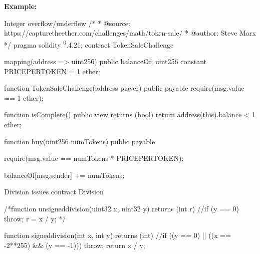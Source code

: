 \documentclass{article}
\begin{document}
\textbf{Example:} 

Integer overflow/underflow
/*
* @source: https://capturetheether.com/challenges/math/token-sale/
* @author: Steve Marx
*/
pragma solidity \textsuperscript0.4.21;
contract TokenSaleChallenge {
    mapping(address => uint256) public balanceOf;
    uint256 constant PRICE\textunderscore PER\textunderscore TOKEN = 1 ether;

    function TokenSaleChallenge(address \textunderscore player) public payable {
        require(msg.value == 1 ether);
    }

    function isComplete() public view returns (bool) {
        return address(this).balance < 1 ether;
    }

    function buy(uint256 numTokens) public payable {
        require(msg.value == numTokens * PRICE\textunderscore PER\textunderscore TOKEN);

        balanceOf[msg.sender] += numTokens;
    }
}

Division issues
contract Division {

    /*function unsigned\textunderscore division(uint32 x, uint32 y) returns (int r) {
      //if (y == 0) { throw; }
      r = x / y;
    }*/

    function signed\textunderscore division(int x, int y) returns (int) {
      //if ((y == 0) || ((x == -2**255) && (y == -1))) { throw; }
      return x / y;
    }

}
\end{document}
